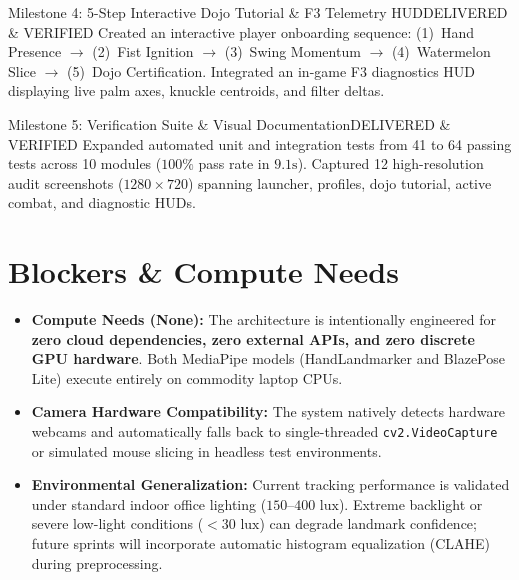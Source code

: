 \documentclass[11pt,a4paper]{article}
\begin{document}
\vspace{0.3em}

\begin{MilestoneCard}{Milestone 4: 5-Step Interactive Dojo Tutorial \& F3 Telemetry HUD}{DELIVERED \& VERIFIED}{}
Created an interactive player onboarding sequence: (1)~Hand Presence $\to$ (2)~Fist Ignition $\to$ (3)~Swing Momentum $\to$ (4)~Watermelon Slice $\to$ (5)~Dojo Certification. Integrated an in-game F3 diagnostics HUD displaying live palm axes, knuckle centroids, and filter deltas.
\end{MilestoneCard}

\vspace{0.3em}

\begin{MilestoneCard}{Milestone 5: Verification Suite \& Visual Documentation}{DELIVERED \& VERIFIED}{}
Expanded automated unit and integration tests from 41 to 64 passing tests across 10 modules ($100\%$ pass rate in $9.1\text{s}$). Captured 12 high-resolution audit screenshots ($1280 \times 720$) spanning launcher, profiles, dojo tutorial, active combat, and diagnostic HUDs.
\end{MilestoneCard}

\section{Blockers \& Compute Needs}

\begin{itemize}[leftmargin=1.5em, itemsep=2pt, topsep=2pt]
  \item \textbf{Compute Needs (None):} The architecture is intentionally engineered for \textbf{zero cloud dependencies, zero external APIs, and zero discrete GPU hardware}. Both MediaPipe models (HandLandmarker and BlazePose Lite) execute entirely on commodity laptop CPUs.
  \item \textbf{Camera Hardware Compatibility:} The system natively detects hardware webcams and automatically falls back to single-threaded \texttt{cv2.VideoCapture} or simulated mouse slicing in headless test environments.
  \item \textbf{Environmental Generalization:} Current tracking performance is validated under standard indoor office lighting ($150\text{--}400\text{ lux}$). Extreme backlight or severe low-light conditions ($< 30\text{ lux}$) can degrade landmark confidence; future sprints will incorporate automatic histogram equalization (CLAHE) during preprocessing.
\end{itemize}
\end{document}
